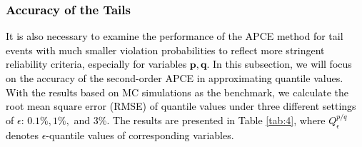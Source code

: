 \documentclass[journal]{IEEEtran}
\theoremstyle{definition}
\theoremstyle{remark}
\begin{document}
\subsubsection{\textcolor{black}{Accuracy of the Tails}} \textcolor{black}{It is also necessary to examine the performance of the APCE method for tail events with much smaller violation probabilities to reflect more stringent reliability criteria, especially for variables ${\boldsymbol{p}, \boldsymbol{q}}$. In this subsection, we will focus on the accuracy of the second-order APCE in approximating quantile values. With the results based on MC simulations as the benchmark, we calculate the root mean square error (RMSE) of quantile values under three different settings of $\epsilon$: $0.1\%, 1\%,$ and $3\%$. The results are presented in Table \ref{tab:4}, where $Q_{\epsilon}^{p/q}$ denotes $\epsilon$-quantile values of corresponding variables.} 
\end{document}
